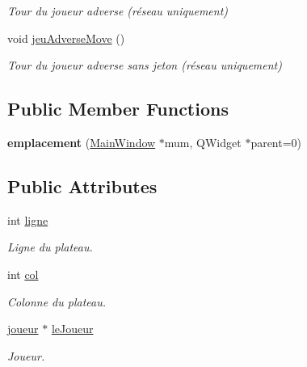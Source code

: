 \begin{DoxyCompactItemize}
\begin{DoxyCompactList}\small\item\em Tour du joueur adverse (réseau uniquement) \end{DoxyCompactList}\item 
\hypertarget{classemplacement_aa786f80d5617b15318e898f2ceacbe97}{void \hyperlink{classemplacement_aa786f80d5617b15318e898f2ceacbe97}{jeu\-Adverse\-Move} ()}\label{classemplacement_aa786f80d5617b15318e898f2ceacbe97}

\begin{DoxyCompactList}\small\item\em Tour du joueur adverse sans jeton (réseau uniquement) \end{DoxyCompactList}\end{DoxyCompactItemize}
\subsection*{Public Member Functions}
\begin{DoxyCompactItemize}
\item 
\hypertarget{classemplacement_ad52a33b25cbb300d91e13906db2a7cc3}{{\bfseries emplacement} (\hyperlink{class_main_window}{Main\-Window} $\ast$mum, Q\-Widget $\ast$parent=0)}\label{classemplacement_ad52a33b25cbb300d91e13906db2a7cc3}

\end{DoxyCompactItemize}
\subsection*{Public Attributes}
\begin{DoxyCompactItemize}
\item 
\hypertarget{classemplacement_aa0e8e131a1d8325f2245c56f8d2e6e8c}{int \hyperlink{classemplacement_aa0e8e131a1d8325f2245c56f8d2e6e8c}{ligne}}\label{classemplacement_aa0e8e131a1d8325f2245c56f8d2e6e8c}

\begin{DoxyCompactList}\small\item\em Ligne du plateau. \end{DoxyCompactList}\item 
\hypertarget{classemplacement_ac0af10e9e8d40e815a8b9633019406b1}{int \hyperlink{classemplacement_ac0af10e9e8d40e815a8b9633019406b1}{col}}\label{classemplacement_ac0af10e9e8d40e815a8b9633019406b1}

\begin{DoxyCompactList}\small\item\em Colonne du plateau. \end{DoxyCompactList}\item 
\hypertarget{classemplacement_ae496fbda5429d0d37f38c2c45f6b88b6}{\hyperlink{classjoueur}{joueur} $\ast$ \hyperlink{classemplacement_ae496fbda5429d0d37f38c2c45f6b88b6}{le\-Joueur}}\label{classemplacement_ae496fbda5429d0d37f38c2c45f6b88b6}

\begin{DoxyCompactList}\small\item\em Joueur. \end{DoxyCompactList}\end{DoxyCompactItemize}


